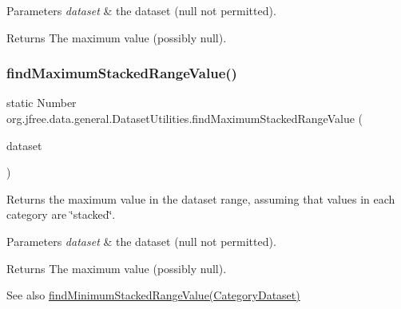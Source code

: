 \begin{DoxyParams}{Parameters}
{\em dataset} & the dataset ({\ttfamily null} not permitted).\\
\hline
\end{DoxyParams}
\begin{DoxyReturn}{Returns}
The maximum value (possibly {\ttfamily null}). 
\end{DoxyReturn}
\mbox{\label{classorg_1_1jfree_1_1data_1_1general_1_1_dataset_utilities_a70a1d79ab34eb976726f3a647ea4565c}} 
\subsubsection{\texorpdfstring{find\+Maximum\+Stacked\+Range\+Value()}{findMaximumStackedRangeValue()}}
{\footnotesize\ttfamily static Number org.\+jfree.\+data.\+general.\+Dataset\+Utilities.\+find\+Maximum\+Stacked\+Range\+Value (\begin{DoxyParamCaption}\item[{\mbox{\hyperlink{interfaceorg_1_1jfree_1_1data_1_1category_1_1_category_dataset}{Category\+Dataset}}}]{dataset }\end{DoxyParamCaption})\hspace{0.3cm}{\ttfamily [static]}}

Returns the maximum value in the dataset range, assuming that values in each category are \char`\"{}stacked\char`\"{}.


\begin{DoxyParams}{Parameters}
{\em dataset} & the dataset ({\ttfamily null} not permitted).\\
\hline
\end{DoxyParams}
\begin{DoxyReturn}{Returns}
The maximum value (possibly {\ttfamily null}).
\end{DoxyReturn}
\begin{DoxySeeAlso}{See also}
\mbox{\hyperlink{classorg_1_1jfree_1_1data_1_1general_1_1_dataset_utilities_af4c50f8d4c50ba9664952917fc2c308a}{find\+Minimum\+Stacked\+Range\+Value(\+Category\+Dataset)}} 
\end{DoxySeeAlso}
\mbox{\label{classorg_1_1jfree_1_1data_1_1general_1_1_dataset_utilities_a0d821218b55d0b250f0393ac366740b3}} 
